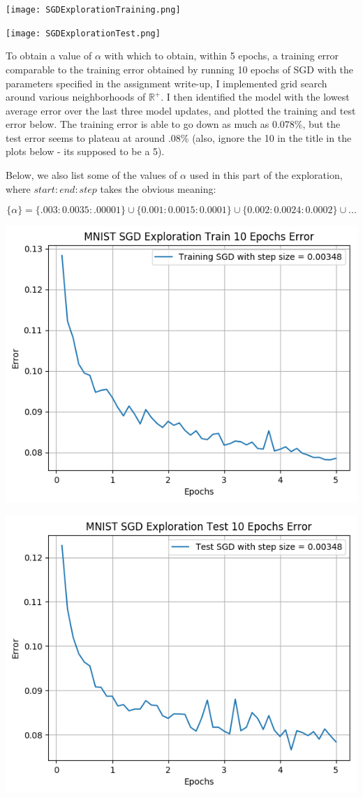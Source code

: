 \documentclass[10pt]{article}
\begin{document}
\begin{center}
    \texttt{[image: SGDExplorationTraining.png]}
    \label{fig:ex_p1tr}
\end{center}
\begin{center}
    \texttt{[image: SGDExplorationTest.png]}
    \label{fig:ex_p1te}
\end{center}

To obtain a value of $\alpha$ with which to obtain, within 5 epochs, a training error comparable to the training error obtained by running 10 epochs of SGD with the parameters specified in the assignment write-up, I implemented grid search around various neighborhoods of $\mathbb{R}^+$. I then identified the model with the lowest average error over the last three model updates, and plotted the training and test error below. The training error is able to go down as much as 0.078\%, but the test error seems to plateau at around .08\% (also, ignore the 10 in the title in the plots below - its supposed to be a 5).

Below, we also list some of the values of $\alpha$ used in this part of the exploration, where $start:end:step$ takes the obvious meaning:

$$ \{\alpha\} = \{.003:0.0035:.00001\} \cup \{0.001:0.0015:0.0001\} \cup \{ 0.002:0.0024:0.0002\} \cup ...$$

\begin{center}
    \includegraphics[width=.45\textwidth]{SGDExplorationTrain5Epochs.png}
    \label{fig:expl3tr}
\end{center}

\begin{center}
    \includegraphics[width=.45\textwidth]{SGDExplorationTest5Epochs.png}
    \label{fig:expl3te}
\end{center}
\end{document}
